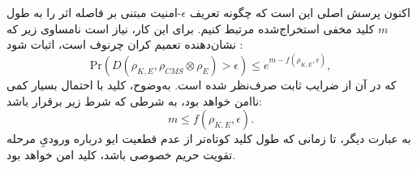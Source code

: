 اکنون پرسش اصلی این است که چگونه تعریف $\epsilon$-امنیت مبتنی بر فاصله اثر را به طول $m$ کلید مخفی استخراج‌شده مرتبط کنیم. برای این کار، نیاز است نامساوی زیر که نشان‌دهنده تعمیم کران چرنوف است، اثبات شود \cite{8-8}:
\begin{equation}
	\text{Pr} \left( D(\rho_{K,E}, \rho_{CMS} \otimes \rho_E) > \epsilon \right) \leq e^{m - f(\rho_{K,E}, \epsilon)},
	\label{eq:8-20}
\end{equation}
که در آن از ضرایب ثابت صرف‌نظر شده است. به‌وضوح، کلید با احتمال بسیار کمی ناامن خواهد بود، به شرطی که شرط زیر برقرار باشد:
\begin{equation}
	m \leq f(\rho_{K,E}, \epsilon).
	\label{eq:8-21}
\end{equation}
به عبارت دیگر، تا زمانی که طول کلید کوتاه‌تر از عدم قطعیت ایو درباره ورودیِ مرحله تقویت حریم خصوصی باشد، کلید امن خواهد بود.

